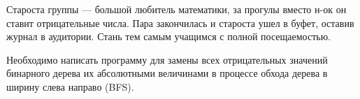 Староста группы --- большой любитель математики, за прогулы вместо н-ок он ставит отрицательные числа. Пара закончилась и староста ушел в буфет, оставив журнал в аудитории. Стань тем самым учащимся с полной посещаемостью. 

Необходимо написать программу для замены всех отрицательных значений бинарного дерева их абсолютными величинами в процессе обхода дерева в ширину слева направо (BFS).
